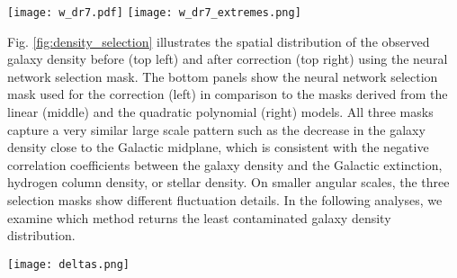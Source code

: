\documentclass[fleqn, usenatbib]{mnras}
\begin{document}
\begin{figure*}
    \centering
    \texttt{[image: w\_dr7.pdf]}
    \texttt{[image: w\_dr7\_extremes.png]}
    \caption{\textit{Left}: Distribution of the selection masks (i.e., estimates of the contamination model) derived from different regression models. \textit{Right}: Spatial scatter of the pixels we remove from our data due to the extreme values of the neural network selection mask.}
    \label{fig:weights}
\end{figure*}


Fig. \ref{fig:density_selection} illustrates the spatial distribution of the observed galaxy density before (top left) and after correction (top right) using the neural network selection mask. The bottom panels show the neural network selection mask used for the correction (left) in comparison to the masks derived from the linear (middle) and the quadratic polynomial (right) models. All three masks capture a very similar large scale pattern such as the decrease in the galaxy density close to the Galactic midplane, which is consistent with the negative correlation coefficients between the galaxy density and the Galactic extinction, hydrogen column density, or stellar density. On smaller angular scales, the three selection masks show different fluctuation details. In the following analyses, we examine which method returns the least contaminated galaxy density distribution. \\

\begin{figure*}
    \centering
    \texttt{[image: deltas.png]}
    \caption{\textit{Top}: the normalized observed galaxy density and corrected density map using the neural network selection mask from left to right, respectively. \textit{Bottom}: the selection masks from the Neural Network, quadratic, and linear polynomial models, respectively from left to right. All three selection masks are able to capture the behavior that the galaxy density systematically drops at the footprint boundaries i.e., high extinction regions.}
    \label{fig:density_selection}
\end{figure*}
\end{document}
